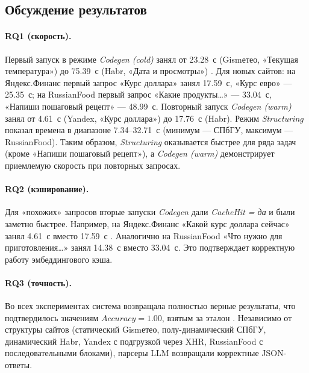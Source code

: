 \subsection{Обсуждение результатов}

\paragraph{RQ1 (скорость).}
Первый запуск в режиме \emph{Codegen (cold)} занял от 23.28~с (Gismетео, «Текущая температура») до 75.39~с (Habr, «Дата и просмотры») \cite{Dong2022CacheLLM}. Для новых сайтов: на Яндекс.Финанс первый запрос «Курс доллара» занял 17.59~с, «Курс евро» — 25.35~с; на RussianFood первый запрос «Какие продукты…» — 33.04~с, «Напиши пошаговый рецепт» — 48.99~с. Повторный запуск \emph{Codegen (warm)} занял от 4.61~с (Yandex, «Курс доллара») до 17.76~с (Habr). Режим \emph{Structuring} показал времена в диапазоне 7.34–32.71~с (минимум — СПбГУ, максимум — RussianFood). Таким образом, \emph{Structuring} оказывается быстрее для ряда задач (кроме «Напиши пошаговый рецепт»), а \emph{Codegen (warm)} демонстрирует приемлемую скорость при повторных запросах.

\paragraph{RQ2 (кэширование).}
Для «похожих» запросов вторые запуски \emph{Codegen} дали \emph{CacheHit = да} и были заметно быстрее. Например, на Яндекс.Финанс «Какой курс доллара сейчас» занял 4.61~с вместо 17.59~с \cite{Reimers2019}. Аналогично на RussianFood «Что нужно для приготовления…» занял 14.38~с вместо 33.04~с. Это подтверждает корректную работу эмбеддингового кэша.

\paragraph{RQ3 (точность).}
Во всех экспериментах система возвращала полностью верные результаты, что подтвердилось значениям $Accuracy = 1.00$, взятым за эталон \cite{Cribbs2019}. Независимо от структуры сайтов (статический Gismетео, полу-динамический СПбГУ, динамический Habr, Yandex с подгрузкой через XHR, RussianFood с последовательными блоками), парсеры LLM возвращали корректные JSON-ответы.

